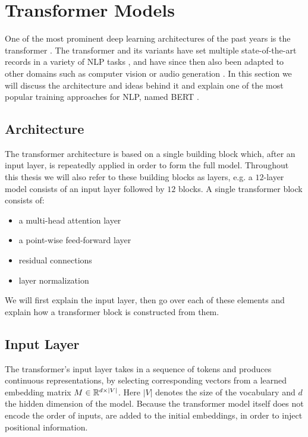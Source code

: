 \section{Transformer Models}
One of the most prominent deep learning architectures of the past years is the transformer \cite{vaswani2017attention}. The transformer and its variants have set multiple state-of-the-art records in a variety of NLP tasks \cite{devlin-etal-2019-bert, DBLP:journals/corr/abs-1907-11692, DBLP:journals/corr/abs-2003-10555, DBLP:journals/corr/abs-1909-08053, DBLP:journals/corr/abs-2005-14165}, and have since then also been adapted to other domains such as computer vision \cite{DBLP:journals/corr/abs-2010-11929} or audio generation \cite{https://doi.org/10.48550/arxiv.2005.00341}.
In this section we will discuss the architecture and ideas behind it and explain one of the most popular training approaches for NLP, named BERT \cite{devlin-etal-2019-bert}.

\subsection{Architecture}
The transformer architecture is based on a single building block which, after an input layer, is repeatedly applied in order to form the full model. Throughout this thesis we will also refer to these building blocks as layers, e.g. a $12$-layer model consists of an input layer followed by $12$ blocks. A single transformer block consists of:
\begin{itemize}
    \item a multi-head attention layer
    \item a point-wise feed-forward layer
    \item residual connections
    \item layer normalization
\end{itemize}

We will first explain the input layer, then go over each of these elements and explain how a transformer block is constructed from them.

\subsection{Input Layer}
The transformer's input layer takes in a sequence of tokens and produces continuous representations, by selecting corresponding vectors from a learned embedding matrix $M \in \mathbb{R}^{d \times |V|}$. Here $|V|$ denotes the size of the vocabulary and $d$ the hidden dimension of the model. Because the transformer model itself does not encode the order of inputs,  are added to the initial embeddings, in order to inject positional information.

